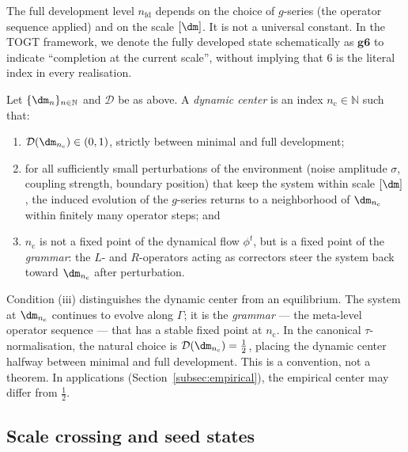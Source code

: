 \begin{remark}
The full development level $n_{\mathrm{fd}}$ depends on the choice
of $g$-series (the operator sequence applied) and on the scale $[\dm]$.
It is not a universal constant. In the TOGT framework, we denote the
fully developed state schematically as $\mathbf{g6}$ to indicate
``completion at the current scale'', without implying that $6$ is the
literal index in every realisation.
\end{remark}

\begin{definition}\label{def:dyncenter}
Let $\{\dm_n\}_{n \in \mathbb{N}}$ and $\mathcal{D}$ be as above.
A \emph{dynamic center} is an index $n_{\mathrm{c}} \in \mathbb{N}$
such that:
\begin{enumerate}[label=(\roman*)]
  \item $\mathcal{D}(\dm_{n_{\mathrm{c}}}) \in (0, 1)$, strictly
    between minimal and full development;
  \item for all sufficiently small perturbations of the environment
    (noise amplitude $\sigma$, coupling strength, boundary position)
    that keep the system within scale $[\dm]$, the induced evolution
    of the $g$-series returns to a neighborhood of $\dm_{n_{\mathrm{c}}}$
    within finitely many operator steps; and
  \item $n_{\mathrm{c}}$ is not a fixed point of the dynamical flow
    $\phi^t$, but is a fixed point of the \emph{grammar}: the $L$-
    and $R$-operators acting as correctors steer the system back
    toward $\dm_{n_{\mathrm{c}}}$ after perturbation.
\end{enumerate}
\end{definition}

\begin{remark}
Condition (iii) distinguishes the dynamic center from an equilibrium.
The system at $\dm_{n_{\mathrm{c}}}$ continues to evolve along $\Gamma$;
it is the \emph{grammar} — the meta-level operator sequence — that has
a stable fixed point at $n_{\mathrm{c}}$. In the canonical
$\tau$-normalisation, the natural choice is
$\mathcal{D}(\dm_{n_{\mathrm{c}}}) = \tfrac{1}{2}$, placing the
dynamic center halfway between minimal and full development. This is
a convention, not a theorem. In applications (Section~\ref{subsec:empirical}),
the empirical center may differ from $\tfrac{1}{2}$.
\end{remark}

\subsection{Scale crossing and seed states}

